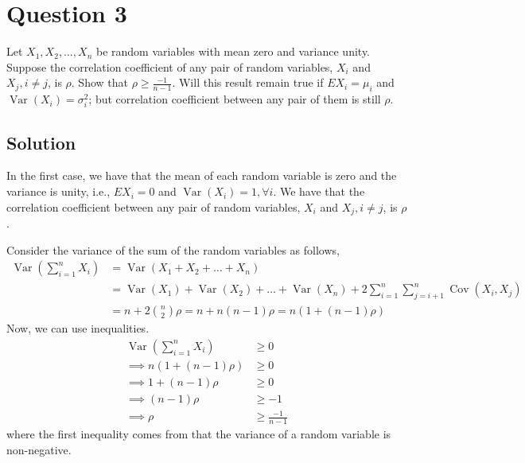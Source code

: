 \section*{Question 3}

Let \( X_{1}, X_{2}, \dots, X_{n} \) be random variables with mean zero and variance unity.
Suppose the correlation coefficient of any pair of random variables, \( X_{i} \) and \( X_{j}, i \neq j \), is \( \rho \).
Show that \( \rho \geq \frac{-1}{n-1} \).
Will this result remain true if \( E X_{i}=\mu_{i} \) and \( \operatorname{Var}\left(X_{i}\right)=\sigma_{i}^{2} \); but correlation coefficient between any pair of them is still \( \rho \).

\subsection*{Solution}

In the first case, we have that the mean of each random variable is zero and the variance is unity, i.e., \( E X_{i}=0 \) and \( \operatorname{Var}\left(X_{i}\right)=1, \forall i \).
We have that the correlation coefficient between any pair of random variables, \( X_{i} \) and \( X_{j}, i \neq j \), is \( \rho \).

Consider the variance of the sum of the random variables as follows,
\begin{align*}
    \operatorname{Var}\left(\sum_{i=1}^{n} X_{i}\right)
     & =
    \operatorname{Var}\left(X_{1} + X_{2} + \dots + X_{n}\right)
    \\ & =
    \operatorname{Var}\left(X_{1}\right) + \operatorname{Var}\left(X_{2}\right) + \dots + \operatorname{Var}\left(X_{n}\right)
    + 2 \sum_{i=1}^{n} \sum_{j=i+1}^{n} \operatorname{Cov}\left(X_{i}, X_{j}\right)
    \\ & =
    n + 2 \binom{n}{2} \rho
    =
    n + n(n-1) \rho
    =
    n(1 + (n-1) \rho)
\end{align*}
Now, we can use inequalities.
\begin{align*}
    \operatorname{Var}\left(\sum_{i=1}^{n} X_{i}\right)
     & \geq
    0
    \\ \implies
    n(1 + (n-1) \rho)
     & \geq
    0
    \\ \implies
    1 + (n-1) \rho
     & \geq
    0
    \\ \implies
    (n-1) \rho
     & \geq
    -1
    \\ \implies
    \rho
     & \geq
    \frac{-1}{n-1}
\end{align*}
where the first inequality comes from that the variance of a random variable is non-negative.
